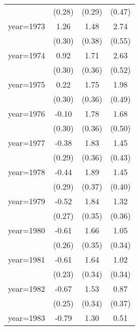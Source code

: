 \begin{sidewaystable}[htbp]
\begin{tabular}{l*{3}{c}}
                &   (0.28)         &   (0.29)         &   (0.47)         \\
\addlinespace
year=1973       &     1.26\sym{***}&     1.48\sym{***}&     2.74\sym{***}\\
                &   (0.30)         &   (0.38)         &   (0.55)         \\
\addlinespace
year=1974       &     0.92\sym{***}&     1.71\sym{***}&     2.63\sym{***}\\
                &   (0.30)         &   (0.36)         &   (0.52)         \\
\addlinespace
year=1975       &     0.22         &     1.75\sym{***}&     1.98\sym{***}\\
                &   (0.30)         &   (0.36)         &   (0.49)         \\
\addlinespace
year=1976       &    -0.10         &     1.78\sym{***}&     1.68\sym{***}\\
                &   (0.30)         &   (0.36)         &   (0.50)         \\
\addlinespace
year=1977       &    -0.38         &     1.83\sym{***}&     1.45\sym{***}\\
                &   (0.29)         &   (0.36)         &   (0.43)         \\
\addlinespace
year=1978       &    -0.44         &     1.89\sym{***}&     1.45\sym{***}\\
                &   (0.29)         &   (0.37)         &   (0.40)         \\
\addlinespace
year=1979       &    -0.52\sym{*}  &     1.84\sym{***}&     1.32\sym{***}\\
                &   (0.27)         &   (0.35)         &   (0.36)         \\
\addlinespace
year=1980       &    -0.61\sym{**} &     1.66\sym{***}&     1.05\sym{***}\\
                &   (0.26)         &   (0.35)         &   (0.34)         \\
\addlinespace
year=1981       &    -0.61\sym{**} &     1.64\sym{***}&     1.02\sym{***}\\
                &   (0.23)         &   (0.34)         &   (0.34)         \\
\addlinespace
year=1982       &    -0.67\sym{***}&     1.53\sym{***}&     0.87\sym{**} \\
                &   (0.25)         &   (0.34)         &   (0.37)         \\
\addlinespace
year=1983       &    -0.79\sym{***}&     1.30\sym{***}&     0.51         \\

\end{tabular}
\end{sidewaystable}
